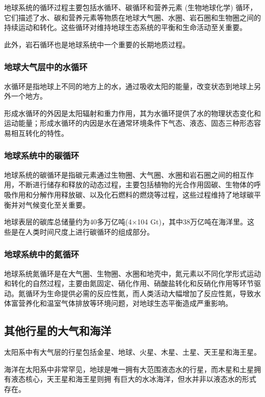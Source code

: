 \documentclass[12pt,a4paper]{article}
\begin{document}
	地球系统的循环过程主要包括水循环、碳循环和营养元素 (生物地球化学) 循环，它们描述了水、碳和营养元素等物质在地球大气圈、水圈、岩石圈和生物圈之间的持续运动和转化。这些循环对维持地球生态系统的平衡和生命活动至关重要。
	
	此外，岩石循环也是地球系统中一个重要的长期地质过程。
	
	\subsubsection{地球大气层中的水循环}
	
	水循环是指地球上不同的地方上的水，通过吸收太阳的能量，改变状态到地球上另外一个地方。
	
	形成水循环的外因是太阳辐射和重力作用，其为水循环提供了水的物理状态变化和运动能量；形成水循环的内因是水在通常环境条件下气态、液态、固态三种形态容易相互转化的特性。
	
	\subsubsection{地球系统中的碳循环}
	
	地球系统的碳循环是指碳元素通过生物圈、大气圈、水圈和岩石圈之间的相互作用，不断进行储存和释放的动态过程，主要包括植物的光合作用固碳、生物体的呼吸作用和分解作用释放碳、以及化石燃料的燃烧等过程，这些过程维持了地球碳平衡并对气候变化至关重要。
	
	地球表层的碳库总储量约为40多万亿吨(4×104 Gt)，其中38万亿吨在海洋里。这
	些是在人类时间尺度上进行碳循环的组成部分。
	
	\subsubsection{地球系统中的氮循环}
	
	地球系统氮循环是在大气圈、生物圈、水圈和地壳中，氮元素以不同化学形式运动和转化的自然过程，主要由氮固定、硝化作用、硝酸盐转化和反硝化作用等环节驱动。氮循环为生命提供必需的反应性氮，而人类活动大幅增加了反应性氮，导致水体富营养化和温室气体排放等环境问题，对地球生态平衡造成严重影响。
	
	\subsection{其他行星的大气和海洋}
	
	太阳系中有大气层的行星包括金星、地球、火星、木星、土星、天王星和海王星。
	
	海洋在太阳系中非常罕见，地球是唯一拥有大范围液态水的行星，而木星和土星拥有液态核心，天王星和海王星则拥
	有巨大的水冰海洋，但水并非以液态水的形式存在。
	
\end{document}
